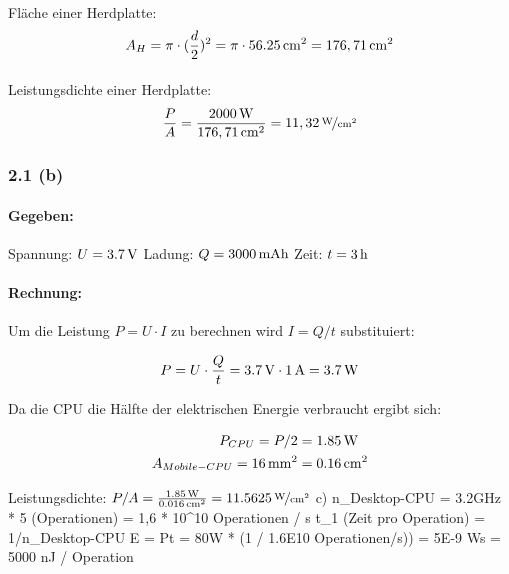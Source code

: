 \documentclass[11pt,a4paper]{article}
\begin{document}
\paragraph{}Fläche einer Herdplatte:
\begin{equation}
A_H = \pi\cdot(\frac{d}{2})^2 =  \pi\cdot\unit[56.25]{cm^2} = \unit[176,71]{cm^2}
\end{equation}

\paragraph{}Leistungsdichte einer Herdplatte:
\begin{equation}
\frac{P}{A} = \frac{\unit[2000]{W}}{\unit[176,71]{cm^2}} = \unitfrac[11,32]{W}{cm^2}
\end{equation}


\subsubsection{2.1 (b)}
\paragraph{Gegeben:}
Spannung: $U = \unit[3.7]{V}$
Ladung: $Q = \unit[3000]{mAh}$
Zeit: $t = \unit[3]{h}$

\paragraph{Rechnung:}
Um die Leistung $P = U \cdot I$ zu berechnen wird $I = Q/t$ substituiert:

\begin{equation}
P = U\cdot\frac{Q}{t} = \unit[3.7]{V} \cdot \unit[1]{A} = \unit[3.7]{W}
\end{equation}

Da die CPU die Hälfte der elektrischen Energie verbraucht ergibt sich:

\begin{align}
P_{CPU} = P/2 &= \unit[1.85]{W}\\
A_{Mobile-CPU} = \unit[16]{mm^2} &= \unit[0.16]{cm^2}
\end{align}


Leistungsdichte: $P/A = \frac{\unit[1.85]{W}}{\unit[0.016]{cm^2}} = \unitfrac[11.5625]{W}{cm^2}$
\iffalse
c)
n_{Desktop-CPU} = 3.2GHz * 5 (Operationen) = 1,6 * 10^10 Operationen / s
t_1 (Zeit pro Operation) = 1/n_{Desktop-CPU}
E = Pt = 80W * (1 / 1.6E10 Operationen/s)) = 5E-9 Ws = 5000 nJ / Operation
\end{document}
